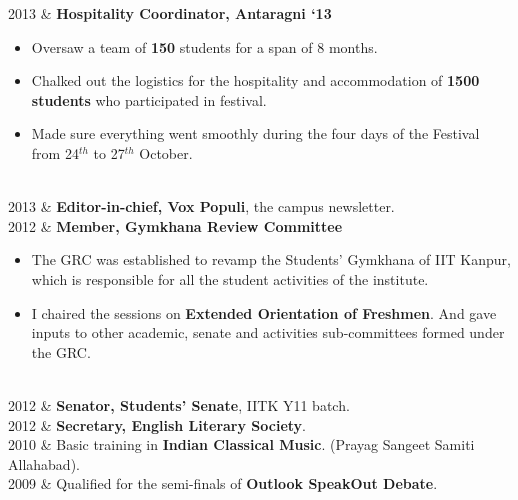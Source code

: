 \documentclass[a4paper,10pt]{article} %
\begin{document}
{    2013 & \textbf{Hospitality Coordinator, Antaragni ‘13}
           \footnotesize{
               \begin{itemize}[leftmargin=*]
                   \item Oversaw a team of \textbf{150} students for a span of 8 months.
                   \item Chalked out the logistics for the hospitality and accommodation of \textbf{1500 students} who
                       participated in festival.
                   \item Made sure everything went smoothly during the four days of the Festival from 24$^{th}$
                       to 27$^{th}$ October.
               \end{itemize}
           }\\

    2013 & \textbf{Editor-in-chief, Vox Populi}, the campus newsletter. \\

    2012 & \textbf{Member, Gymkhana Review Committee}
           \footnotesize{
               \begin{itemize}[leftmargin=*]
                   \item The GRC was established to revamp the Students' Gymkhana of IIT Kanpur,
                       which is responsible for all the student activities of the institute.
                   \item I chaired the sessions on \textbf{Extended Orientation of Freshmen}.
                       And gave inputs to other academic, senate and activities sub-committees formed under the GRC.
               \end{itemize}
           }\\

    2012 & \textbf{Senator, Students' Senate}, IITK Y11 batch. \\

    2012 & \textbf{Secretary, English Literary Society}. \\

    2010 & Basic training in \textbf{Indian Classical Music}. (Prayag Sangeet Samiti Allahabad). \\

    2009 & Qualified for the semi-finals of \textbf{Outlook SpeakOut Debate}. \\
}

\end{document}
